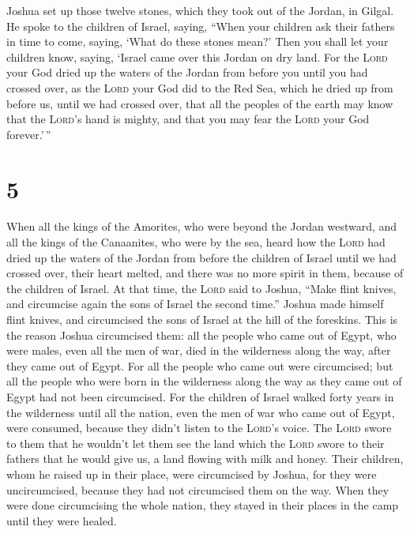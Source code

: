  Joshua set up those twelve stones, which they took out
of the Jordan, in Gilgal.  He spoke to the children of
Israel, saying, ``When your children ask their fathers in time to come,
saying, `What do these stones mean?'  Then you shall let
your children know, saying, `Israel came over this Jordan on dry land.
 For the \textsc{Lord} your God dried up the waters of
the Jordan from before you until you had crossed over, as the
\textsc{Lord} your God did to the Red Sea, which he dried up from before
us, until we had crossed over,  that all the peoples of
the earth may know that the \textsc{Lord}'s hand is mighty, and that you
may fear the \textsc{Lord} your God forever.'\,''

\hypertarget{section-4}{%
\section{5}\label{section-4}}

 When all the kings of the Amorites, who were beyond the
Jordan westward, and all the kings of the Canaanites, who were by the
sea, heard how the \textsc{Lord} had dried up the waters of the Jordan
from before the children of Israel until we had crossed over, their
heart melted, and there was no more spirit in them, because of the
children of Israel.  At that time, the \textsc{Lord} said
to Joshua, ``Make flint knives, and circumcise again the sons of Israel
the second time.''  Joshua made himself flint knives, and
circumcised the sons of Israel at the hill of the foreskins.
 This is the reason Joshua circumcised them: all the
people who came out of Egypt, who were males, even all the men of war,
died in the wilderness along the way, after they came out of Egypt.
 For all the people who came out were circumcised; but all
the people who were born in the wilderness along the way as they came
out of Egypt had not been circumcised.  For the children
of Israel walked forty years in the wilderness until all the nation,
even the men of war who came out of Egypt, were consumed, because they
didn't listen to the \textsc{Lord}'s voice. The \textsc{Lord} swore to
them that he wouldn't let them see the land which the \textsc{Lord}
swore to their fathers that he would give us, a land flowing with milk
and honey.  Their children, whom he raised up in their
place, were circumcised by Joshua, for they were uncircumcised, because
they had not circumcised them on the way.  When they were
done circumcising the whole nation, they stayed in their places in the
camp until they were healed.

